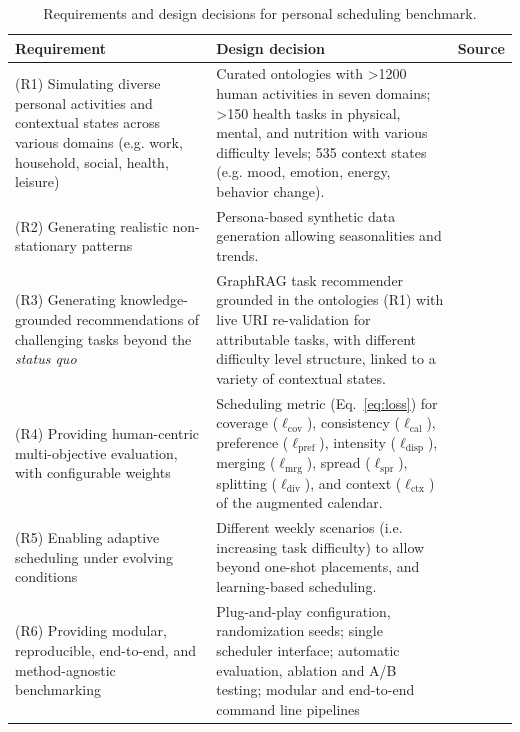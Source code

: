 \documentclass[runningheads]{llncs}
\begin{document}
\begin{table}[t]
\centering
\caption{Requirements and design decisions for personal scheduling benchmark.}
\label{tab:req}
\setlength{\tabcolsep}{4pt}\footnotesize
\begin{tabular}{>{\raggedright\arraybackslash}p{}>{\raggedright\arraybackslash}p{}>{\raggedright\arraybackslash}p{}}
\toprule
Requirement & Design decision & Source \\
\midrule
(R1) Simulating diverse personal activities and contextual states across various domains (e.g. work, household, social, health, leisure) &
Curated ontologies with >1200 human activities in seven domains; >150 health tasks in physical, mental, and nutrition with various difficulty levels; 535 context states (e.g. mood, emotion, energy, behavior change). &
\citep{compendium,wood_habits_2022} \\
\midrule
(R2) Generating realistic non-stationary patterns &
Persona-based synthetic data generation allowing seasonalities and trends. &
\citep{heino_studying_2021,maas_generating_2026, Barabasi2005} \\
\midrule
(R3) Generating knowledge-grounded recommendations of challenging tasks beyond the \textit{status quo} &
GraphRAG task recommender grounded in the ontologies (R1) with live URI re-validation for attributable tasks, with different difficulty level structure, linked to a variety of contextual states. &
\citep{zhang_survey_2025,James2024TowardsInterventions} \\
\midrule
(R4) Providing human-centric multi-objective evaluation, with configurable weights &
Scheduling metric (Eq.~\ref{eq:loss}) for coverage ($\ell_{\mathrm{cov}}$), consistency ($\ell_{\mathrm{cal}}$), preference ($\ell_{\mathrm{pref}}$), intensity ($\ell_{\mathrm{disp}}$), merging ($\ell_{\mathrm{mrg}}$), spread ($\ell_{\mathrm{spr}}$), splitting ($\ell_{\mathrm{div}}$), and context ($\ell_{\mathrm{ctx}}$) of the augmented calendar. &
\citep{does_time_management,Berry2011PTIME:Calendaring,Grabisch1996,cpsat} \\
\midrule
(R5) Enabling adaptive scheduling under evolving conditions   &
Different weekly scenarios (i.e. increasing task difficulty) to allow beyond one-shot placements, and learning-based scheduling. &
\citep{jorke_gptcoach_2025,shin_planfitting_2025} \\
\midrule
(R6) Providing modular, reproducible, end-to-end, and method-agnostic benchmarking &
Plug-and-play configuration, randomization seeds; single scheduler interface; automatic evaluation, ablation and A/B testing; modular and end-to-end command line pipelines  &
\citep{hendrycks_mmlu_2021,rein_gpqa_2024,ftgpm,user_simulation} \\
\bottomrule
\end{tabular}
\end{table}
\end{document}
